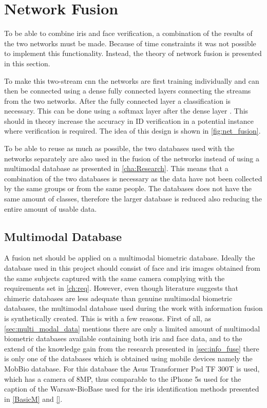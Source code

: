 \section{Network Fusion}
To be able to combine iris and face verification, a combination of the results of the two networks must be made. Because of time constraints it was not possible to implement this functionality. Instead, the theory of network fusion is presented in this section.

To make this two-stream \gls{cnn} the networks are first training individually and can then be connected using a dense fully connected layers connecting the streams from the two networks. After the fully connected layer a classification is necessary. This can be done using a softmax layer after the dense layer \citep{Eitel2015}. This should in theory increase the accuracy in ID verification in a potential instance where verification is required. The idea of this design is shown in \autoref{fig:net_fusion}.

To be able to reuse as much as possible, the two databases used with the networks separately are also used in the fusion of the networks instead of using a multimodal database as presented in \autoref{cha:Research}. 
This means that a combination of the two databases is necessary as the data have not been collected by the same groups or from the same people. The databases does not have the same amount of classes, therefore the larger database is reduced also reducing the entire amount of usable data.

\subsection{Multimodal Database}
A fusion net should be applied on a multimodal biometric database. Ideally the database used in this project should consist of face and iris images obtained from the same subjects captured with the same camera complying with the requirements set in \autoref{ch:req}. However, even though literature suggests that chimeric databases are less adequate than genuine multimodal biometric databases, the multimodal database used during the work with information fusion is synthetically created. This is with a few reasons. First of all, as \autoref{sec:multi_modal_data} mentions there are only a limited amount of multimodal biometric databases available containing both iris and face data, and to the extend of the knowledge gain from the research presented in \autoref{sec:info_fuse} there is only one of the databases which is obtained using mobile devices namely the MobBio database. For this database the Asus Transformer Pad TF 300T is used, which has a camera of 8MP, thus comparable to the iPhone 5s used for the caption of the Warsaw-BioBase used for the iris identification methods presented in \autoref{BasicM} and \autoref{}. 